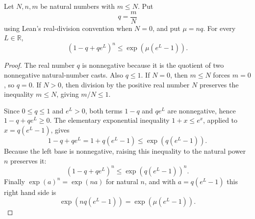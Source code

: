 \begin{helper}
Let \(N,n,m\) be natural numbers with \(m\le N\).  Put
\[
q=\frac{m}{N}
\]
using Lean's real-division convention when \(N=0\), and put \(\mu=nq\).  For
every \(L\in\mathbb R\),
\[
(1-q+q e^L)^n\le \exp(\mu(e^L-1)).
\]
\end{helper}
\begin{proof}
The real number \(q\) is nonnegative because it is the quotient of two
nonnegative natural-number casts.  Also \(q\le 1\).  If \(N=0\), then
\(m\le N\) forces \(m=0\), so \(q=0\).  If \(N>0\), then division by the
positive real number \(N\) preserves the inequality \(m\le N\), giving
\(m/N\le 1\).

Since \(0\le q\le 1\) and \(e^L>0\), both terms \(1-q\) and \(q e^L\) are
nonnegative, hence \(1-q+q e^L\ge0\).  The elementary exponential inequality
\(1+x\le e^x\), applied to \(x=q(e^L-1)\), gives
\[
1-q+q e^L = 1+q(e^L-1)\le \exp(q(e^L-1)).
\]
Because the left base is nonnegative, raising this inequality to the natural
power \(n\) preserves it:
\[
(1-q+q e^L)^n\le \exp(q(e^L-1))^n.
\]
Finally \(\exp(a)^n=\exp(na)\) for natural \(n\), and with
\(a=q(e^L-1)\) this right hand side is
\[
\exp(nq(e^L-1))=\exp(\mu(e^L-1)).
\]
\end{proof}
